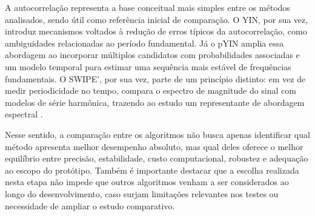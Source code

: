 A autocorrelação representa a base conceitual mais simples entre os métodos analisados, sendo útil como referência inicial de comparação. O YIN, por sua vez, introduz mecanismos voltados à redução de erros típicos da autocorrelação, como ambiguidades relacionadas ao período fundamental. Já o pYIN amplia essa abordagem ao incorporar múltiplos candidatos com probabilidades associadas e um modelo temporal para estimar uma sequência mais estável de frequências fundamentais. O SWIPE', por sua vez, parte de um princípio distinto: em vez de medir periodicidade no tempo, compara o espectro de magnitude do sinal com modelos de série harmônica, trazendo ao estudo um representante de abordagem espectral \cite{delacuadra2007pitch, mauch2014pyin, decheveigne2002yin, camacho2008swipe}.

Nesse sentido, a comparação entre os algoritmos não busca apenas identificar qual método apresenta melhor desempenho absoluto, mas qual deles oferece o melhor equilíbrio entre precisão, estabilidade, custo computacional, robustez e adequação ao escopo do protótipo. Também é importante destacar que a escolha realizada nesta etapa não impede que outros algoritmos venham a ser considerados ao longo do desenvolvimento, caso surjam limitações relevantes nos testes ou necessidade de ampliar o estudo comparativo.

